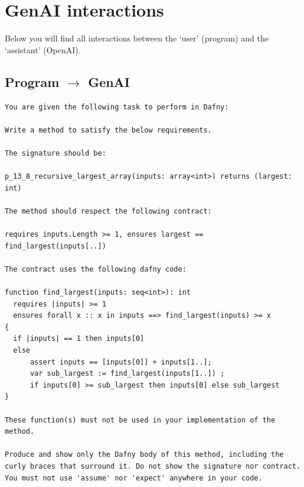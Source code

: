 \documentclass{article}
\begin{document}
\section*{GenAI interactions}
Below you will find all interactions between the `user' (program) and the `assistant' (OpenAI).
\subsection*{Program $\rightarrow$ GenAI}
\begin{lstlisting}
You are given the following task to perform in Dafny:

Write a method to satisfy the below requirements.

The signature should be:

p_13_8_recursive_largest_array(inputs: array<int>) returns (largest: int)

The method should respect the following contract:

requires inputs.Length >= 1, ensures largest == find_largest(inputs[..])

The contract uses the following dafny code:

function find_largest(inputs: seq<int>): int
  requires |inputs| >= 1
  ensures forall x :: x in inputs ==> find_largest(inputs) >= x
{
  if |inputs| == 1 then inputs[0]
  else 
      assert inputs == [inputs[0]] + inputs[1..];
      var sub_largest := find_largest(inputs[1..]) ;
      if inputs[0] >= sub_largest then inputs[0] else sub_largest
}

These function(s) must not be used in your implementation of the method.

Produce and show only the Dafny body of this method, including the curly braces that surround it. Do not show the signature nor contract. You must not use 'assume' nor 'expect' anywhere in your code.
\end{lstlisting}
\end{document}
